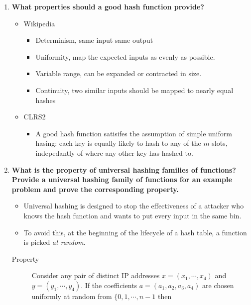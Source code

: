 \documentclass[a4paper,11pt]{article}
\begin{document}
\begin{enumerate}
\def\labelenumi{\arabic{enumi}.}
\item
  \textbf{What properties should a good hash function provide?}

  \begin{itemize}
  \itemsep1pt\parskip0pt
  \item
    Wikipedia

    \begin{itemize}
    \itemsep1pt\parskip0pt
    \item
      Determinism, same input same output
    \item
      Uniformity, map the expected inputs as evenly as possible.
    \item
      Variable range, can be expanded or contracted in size.
    \item
      Continuity, two similar inputs should be mapped to nearly equal
      hashes
    \end{itemize}
  \item
    CLRS2

    \begin{itemize}
    \itemsep1pt\parskip0pt
    \item
      A good hash function satisifes the assumption of simple uniform
      hasing: each key is equally likely to hash to any of the $m$
      slots, indepedantly of where any other key has hashed to.
    \end{itemize}
  \end{itemize}
\item
  \textbf{What is the property of universal hashing families of
  functions? Provide a universal hashing family of functions for an
  example problem and prove the corresponding property.}

  \begin{itemize}
  \itemsep1pt\parskip0pt
  \item
    Universal hashing is designed to stop the effectiveness of a
    attacker who knows the hash function and wants to put every input in
    the same bin.
  \item
    To avoid this, at the beginning of the lifecycle of a hash table, a
    function is picked \emph{at random}.
  \end{itemize}

  \begin{description}
  \item[Property]
  Consider any pair of distinct IP addresses $x = (x_1, \cdots, x_4)$
  and $y = (y_1, \cdots, y_4)$. If the coefficients
  $a = (a_1, a_2, a_3, a_4)$ are chosen uniformly at random from
  $\lbrace 0, 1, \cdots, n - 1$ then


\end{description}
\end{enumerate}
\end{document}
